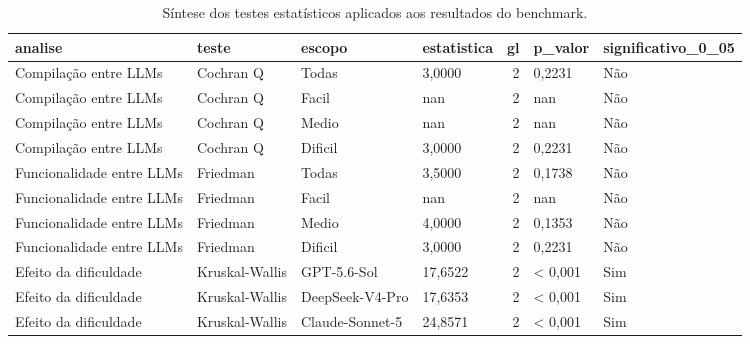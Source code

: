\begin{table}
\caption{Síntese dos testes estatísticos aplicados aos resultados do benchmark.}
\label{tab:testes_estatisticos}
\begin{tabular}{llllrll}
\toprule
analise & teste & escopo & estatistica & gl & p\_valor & significativo\_0\_05 \\
\midrule
Compilação entre LLMs & Cochran Q & Todas & 3,0000 & 2 & 0,2231 & Não \\
Compilação entre LLMs & Cochran Q & Facil & nan & 2 & nan & Não \\
Compilação entre LLMs & Cochran Q & Medio & nan & 2 & nan & Não \\
Compilação entre LLMs & Cochran Q & Dificil & 3,0000 & 2 & 0,2231 & Não \\
Funcionalidade entre LLMs & Friedman & Todas & 3,5000 & 2 & 0,1738 & Não \\
Funcionalidade entre LLMs & Friedman & Facil & nan & 2 & nan & Não \\
Funcionalidade entre LLMs & Friedman & Medio & 4,0000 & 2 & 0,1353 & Não \\
Funcionalidade entre LLMs & Friedman & Dificil & 3,0000 & 2 & 0,2231 & Não \\
Efeito da dificuldade & Kruskal-Wallis & GPT-5.6-Sol & 17,6522 & 2 & < 0,001 & Sim \\
Efeito da dificuldade & Kruskal-Wallis & DeepSeek-V4-Pro & 17,6353 & 2 & < 0,001 & Sim \\
Efeito da dificuldade & Kruskal-Wallis & Claude-Sonnet-5 & 24,8571 & 2 & < 0,001 & Sim \\
\bottomrule
\end{tabular}
\end{table}
